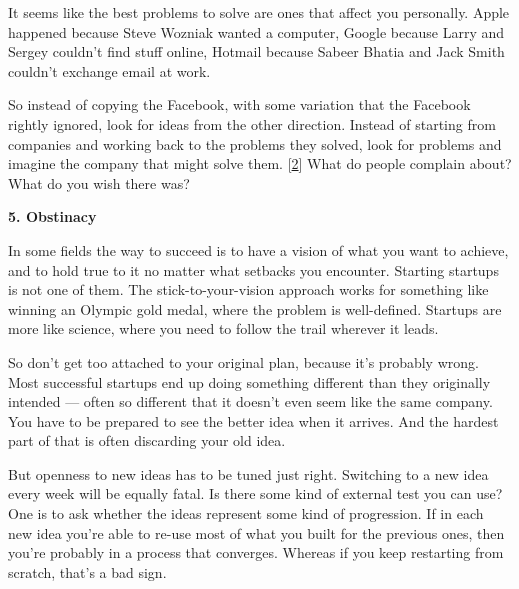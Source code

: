 It seems like the best
                    problems to solve are ones that affect you personally. Apple
                    happened because Steve Wozniak wanted a computer, Google
                    because Larry and Sergey couldn't find stuff online, Hotmail
                    because Sabeer Bhatia and Jack Smith couldn't exchange email
                    at work.

So instead of copying the Facebook, with
                    some variation that the Facebook rightly ignored, look for
                    ideas from the other direction. Instead of starting from
                    companies and working back to the problems they solved, look
                    for problems and imagine the company that might solve them.
                    [\href{\#f2n}{2}]
                    What do people complain about? What do you wish there
                    was?

\textbf{5. Obstinacy}

In some
                    fields the way to succeed is to have a vision of what you
                    want to achieve, and to hold true to it no matter what
                    setbacks you encounter. Starting startups is not one of
                    them. The stick-to-your-vision approach works for something
                    like winning an Olympic gold medal, where the problem is
                    well-defined. Startups are more like science, where you need
                    to follow the trail wherever it leads.

So don't
                    get too attached to your original plan, because it's
                    probably wrong. Most successful startups end up doing
                    something different than they originally intended ---
                    often so different that it doesn't even seem like the same
                    company. You have to be prepared to see the better idea when
                    it arrives. And the hardest part of that is often discarding
                    your old idea.

But openness to new ideas has to
                    be tuned just right. Switching to a new idea every week will
                    be equally fatal. Is there some kind of external test you
                    can use? One is to ask whether the ideas represent some kind
                    of progression. If in each new idea you're able to re-use
                    most of what you built for the previous ones, then you're
                    probably in a process that converges. Whereas if you keep
                    restarting from scratch, that's a bad sign.

